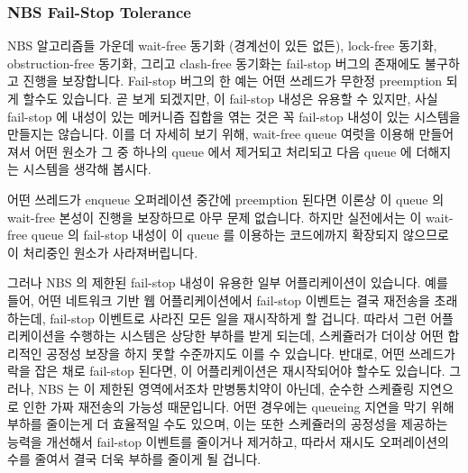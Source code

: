 \fi

\subsubsection{NBS Fail-Stop Tolerance}
\label{sec:advsync:NBS Fail-Stop Tolerance}

NBS 알고리즘들 가운데 wait-free 동기화 (경계선이 있든 없든), lock-free 동기화,
obstruction-free 동기화, 그리고 clash-free 동기화는 fail-stop 버그의 존재에도
불구하고 진행을 보장합니다.
Fail-stop 버그의 한 예는 어떤 쓰레드가 무한정 preemption 되게 할수도 있습니다.
곧 보게 되겠지만, 이 fail-stop 내성은 유용할 수 있지만, 사실 fail-stop 에
내성이 있는 메커니즘 집합을 엮는 것은 꼭 fail-stop 내성이 있는 시스템을
만들지는 않습니다.
이를 더 자세히 보기 위해, wait-free queue 여럿을 이용해 만들어져서 어떤 원소가
그 중 하나의 queue 에서 제거되고 처리되고 다음 queue 에 더해지는 시스템을
생각해 봅시다.

어떤 쓰레드가 enqueue 오퍼레이션 중간에 preemption 된다면 이론상 이 queue 의
wait-free 본성이 진행을 보장하므로 아무 문제 없습니다.
하지만 실전에서는 이 wait-free queue 의 fail-stop 내성이 이 queue 를 이용하는
코드에까지 확장되지 않으므로 이 처리중인 원소가 사라져버립니다.

\iffalse

Of the classes of NBS algorithms, wait-free synchronization (bounded or
otherwise), lock-free synchronization, obstruction-free synchronization,
and clash-free synchronization guarantee forward progress even in the
presence of fail-stop bugs.
An example fail-stop bug might cause some thread to be preempted indefinitely.
As we will see, this fail-stop-tolerant property can be useful, but the
fact is that composing a set of fail-stop-tolerant mechanisms does not
necessarily result in a fail-stop-tolerant system.
To see this, consider a system made up of a series of wait-free queues,
where an element is removed from one queue in the series, processed,
and then added to the next queue.

If a thread is preempted in the midst of a queuing operation, in theory
all is well because the wait-free nature of the queue will guarantee
forward progress.
But in practice, the element being processed is lost because the
fail-stop-tolerant nature of the wait-free queues does not extend to
the code using those queues.

\fi

그러나 NBS 의 제한된 fail-stop 내성이 유용한 일부 어플리케이션이 있습니다.
예를 들어, 어떤 네트워크 기반 웹 어플리케이션에서 fail-stop 이벤트는 결국
재전송을 초래하는데, fail-stop 이벤트로 사라진 모든 일을 재시작하게 할 겁니다.
따라서 그런 어플리케이션을 수행하는 시스템은 상당한 부하를 받게 되는데,
스케쥴러가 더이상 어떤 합리적인 공정성 보장을 하지 못할 수준까지도 이를 수
있습니다.
반대로, 어떤 쓰레드가 락을 잡은 채로 fail-stop 된다면, 이 어플리케이션은
재시작되어야 할수도 있습니다.
그러나, NBS 는 이 제한된 영역에서조차 만병통치약이 아닌데, 순수한 스케쥴링
지연으로 인한 가짜 재전송의 가능성 때문입니다.
어떤 경우에는 queueing 지연을 막기 위해 부하를 줄이는게 더 효율적일 수도
있으며, 이는 또한 스케쥴러의 공정성을 제공하는 능력을 개선해서 fail-stop
이벤트를 줄이거나 제거하고, 따라서 재시도 오퍼레이션의 수를 줄여서 결국 더욱
부하를 줄이게 될 겁니다.


